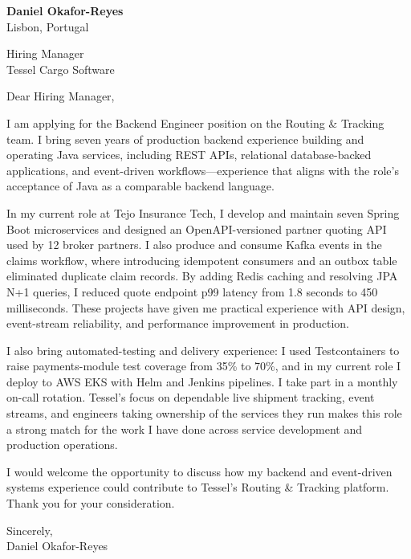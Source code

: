 \documentclass[11pt,a4paper]{article}
\begin{document}
{\Large\bfseries\color{primarycolor} Daniel Okafor-Reyes}\\
Lisbon, Portugal

Hiring Manager\\
Tessel Cargo Software

Dear Hiring Manager,

I am applying for the Backend Engineer position on the Routing & Tracking team. I bring seven years of production backend experience building and operating Java services, including REST APIs, relational database-backed applications, and event-driven workflows—experience that aligns with the role’s acceptance of Java as a comparable backend language.

In my current role at Tejo Insurance Tech, I develop and maintain seven Spring Boot microservices and designed an OpenAPI-versioned partner quoting API used by 12 broker partners. I also produce and consume Kafka events in the claims workflow, where introducing idempotent consumers and an outbox table eliminated duplicate claim records. By adding Redis caching and resolving JPA N+1 queries, I reduced quote endpoint p99 latency from 1.8 seconds to 450 milliseconds. These projects have given me practical experience with API design, event-stream reliability, and performance improvement in production.

I also bring automated-testing and delivery experience: I used Testcontainers to raise payments-module test coverage from 35\% to 70\%, and in my current role I deploy to AWS EKS with Helm and Jenkins pipelines. I take part in a monthly on-call rotation. Tessel’s focus on dependable live shipment tracking, event streams, and engineers taking ownership of the services they run makes this role a strong match for the work I have done across service development and production operations.

I would welcome the opportunity to discuss how my backend and event-driven systems experience could contribute to Tessel’s Routing & Tracking platform. Thank you for your consideration.

Sincerely,\\
Daniel Okafor-Reyes
\end{document}
